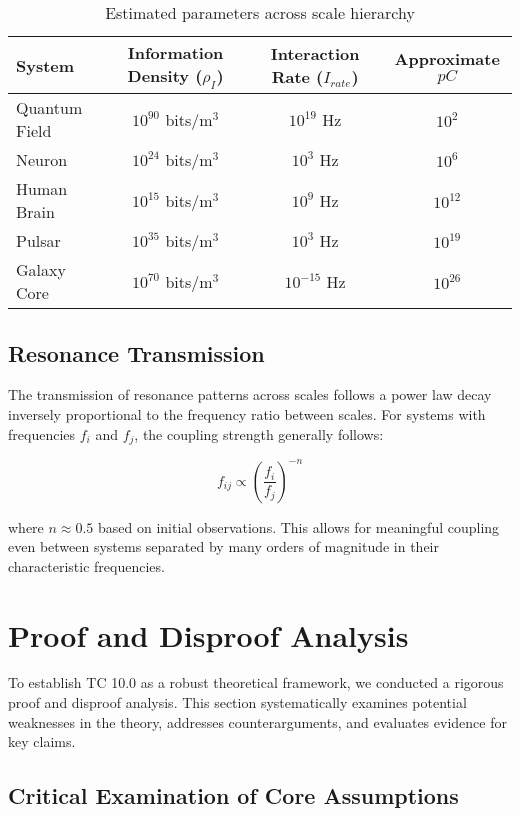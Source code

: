 \documentclass[12pt]{article}
\begin{document}
\begin{table}[h]
\centering
\begin{tabular}{|l|c|c|c|}
\hline
\textbf{System} & \textbf{Information Density ($\rho_I$)} & \textbf{Interaction Rate ($I_{rate}$)} & \textbf{Approximate $pC$} \\
\hline
Quantum Field & $10^{90}$ bits/m$^3$ & $10^{19}$ Hz & $10^{2}$ \\
\hline
Neuron & $10^{24}$ bits/m$^3$ & $10^{3}$ Hz & $10^{6}$ \\
\hline
Human Brain & $10^{15}$ bits/m$^3$ & $10^{9}$ Hz & $10^{12}$ \\
\hline
Pulsar & $10^{35}$ bits/m$^3$ & $10^{3}$ Hz & $10^{19}$ \\
\hline
Galaxy Core & $10^{70}$ bits/m$^3$ & $10^{-15}$ Hz & $10^{26}$ \\
\hline
\end{tabular}
\caption{Estimated parameters across scale hierarchy}
\end{table}

\subsection{Resonance Transmission}

The transmission of resonance patterns across scales follows a power law decay inversely proportional to the frequency ratio between scales. For systems with frequencies $f_i$ and $f_j$, the coupling strength generally follows:

\begin{equation}
f_{ij} \propto \left(\frac{f_i}{f_j}\right)^{-n}
\end{equation}

where $n \approx 0.5$ based on initial observations. This allows for meaningful coupling even between systems separated by many orders of magnitude in their characteristic frequencies.

\section{Proof and Disproof Analysis}

To establish TC 10.0 as a robust theoretical framework, we conducted a rigorous proof and disproof analysis. This section systematically examines potential weaknesses in the theory, addresses counterarguments, and evaluates evidence for key claims.

\subsection{Critical Examination of Core Assumptions}
\end{document}
